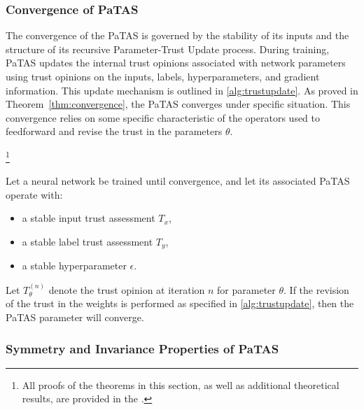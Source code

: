 \subsubsection{Convergence of PaTAS}
\label{sec:ptas_convergence}

The convergence of the PaTAS is governed by the stability of its inputs and the structure of its recursive Parameter-Trust Update process. During training, PaTAS updates the internal trust opinions associated with network parameters using trust opinions on the inputs, labels, hyperparameters, and gradient information. This update mechanism is outlined in \cref{alg:trustupdate}. As proved in Theorem~\ref{thm:convergence}, the PaTAS converges under specific situation. This convergence relies on some specific characteristic of the operators used to feedforward and revise the trust in the parameters \(\theta\). 



\begin{theorem}\label{thm:convergence}
\footnote{All proofs of the theorems in this section, as well as additional theoretical results, are provided in the \suppp.}

Let a neural network be trained until convergence, and let its associated PaTAS operate with:

\begin{itemize}
    \item a stable input trust assessment $T_x$,
    \item a stable label trust assessment $T_y$,
    \item a stable hyperparameter $\epsilon$.
\end{itemize}

Let $T_\theta^{(n)}$ denote the trust opinion at iteration $n$ for parameter $\theta$. If the revision of the trust in the weights is performed as specified in \cref{alg:trustupdate}, then the PaTAS parameter will converge.
\end{theorem}
\subsubsection{Symmetry and Invariance Properties of PaTAS}\label{sec:ptassyminv}

